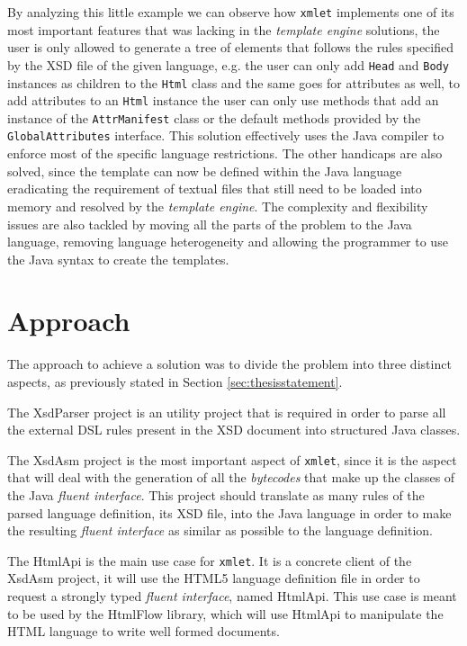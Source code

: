 \noindent
By analyzing this little example we can observe how \texttt{xmlet} implements one of its most important features that was lacking in the \textit{template engine} solutions, the user is only allowed to generate a tree of elements that follows the rules specified by the \ac{XSD} file of the given language, e.g. the user can only add \texttt{Head} and \texttt{Body} instances as children to the \texttt{Html} class and the same goes for attributes as well, to add attributes to an \texttt{Html} instance the user can only use methods that add an instance of the \texttt{AttrManifest} class or the default methods provided by the \texttt{GlobalAttributes} interface. This solution effectively uses the Java compiler to enforce most of the specific language restrictions. The other handicaps are also solved, since the template can now be defined within the Java language eradicating the requirement of textual files that still need to be loaded into memory and resolved by the \textit{template engine}. The complexity and flexibility issues are also tackled by moving all the parts of the problem to the Java language, removing language heterogeneity and allowing the programmer to use the Java syntax to create the templates.

\section{Approach}
\label{sec:approach}

The approach to achieve a solution was to divide the problem into three distinct aspects, as previously stated in Section \ref{sec:thesisstatement}. 

\noindent
The XsdParser project is an utility project that is required in order to parse all the external \ac{DSL} rules present in the \ac{XSD} document into structured Java classes. 

\noindent
The XsdAsm project is the most important aspect of \texttt{xmlet}, since it is the aspect that will deal with the generation of all the \textit{bytecodes} that make up the classes of the Java \textit{fluent interface}. This project should translate as many rules of the parsed language definition, its \ac{XSD} file, into the Java language in order to make the resulting \textit{fluent interface} as similar as possible to the language definition.

\noindent
The HtmlApi is the main use case for \texttt{xmlet}. It is a concrete client of the XsdAsm project, it will use the \ac{HTML}5 language definition file in order to request a strongly typed \textit{fluent interface}, named HtmlApi. This use case is meant to be used by the HtmlFlow library, which will use HtmlApi to manipulate the \ac{HTML} language to write well formed documents.